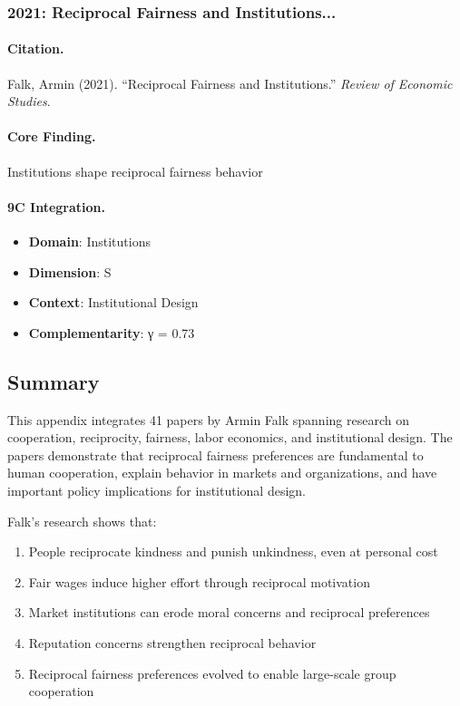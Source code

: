 \subsubsection{2021: Reciprocal Fairness and Institutions...}

\paragraph{Citation.}
Falk, Armin (2021). ``Reciprocal Fairness and Institutions.''
\textit{Review of Economic Studies}.

\paragraph{Core Finding.}
Institutions shape reciprocal fairness behavior

\paragraph{9C Integration.}
\begin{itemize}[nosep]
  \item \textbf{Domain}: Institutions
  \item \textbf{Dimension}: S
  \item \textbf{Context}: Institutional Design
  \item \textbf{Complementarity}: γ = 0.73
\end{itemize}


\subsection{Summary}

This appendix integrates 41 papers by Armin Falk spanning research on
cooperation, reciprocity, fairness, labor economics, and institutional design. The papers demonstrate
that reciprocal fairness preferences are fundamental to human cooperation, explain behavior in
markets and organizations, and have important policy implications for institutional design.

Falk's research shows that:
\begin{enumerate}
  \item People reciprocate kindness and punish unkindness, even at personal cost
  \item Fair wages induce higher effort through reciprocal motivation
  \item Market institutions can erode moral concerns and reciprocal preferences
  \item Reputation concerns strengthen reciprocal behavior
  \item Reciprocal fairness preferences evolved to enable large-scale group cooperation
\end{enumerate}


